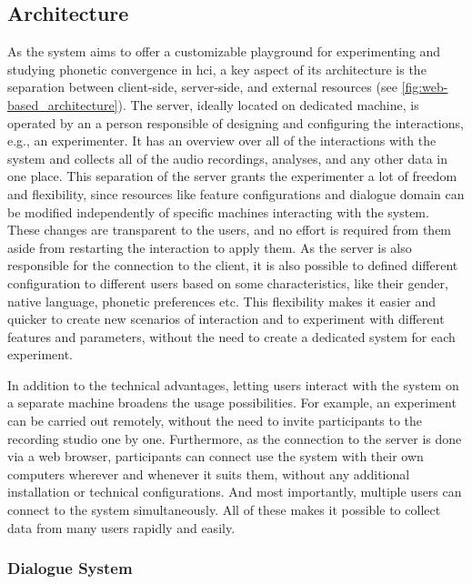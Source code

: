\subsection{Architecture}
\label{subsec:architecture}

As the system aims to offer a customizable playground for experimenting and studying phonetic convergence in \ac{hci}, a key aspect of its architecture is the separation between client-side, server-side, and external resources (see \cref{fig:web-based_architecture}).
The server, ideally located on dedicated machine, is operated by an a person responsible of designing and configuring the interactions, e.g., an experimenter.
It has an overview over all of the interactions with the system and collects all of the audio recordings, analyses, and any other data in one place.
This separation of the server grants the experimenter a lot of freedom and flexibility, since resources like feature configurations and dialogue domain can be modified independently of specific machines interacting with the system.
These changes are transparent to the users, and no effort is required from them aside from restarting the interaction to apply them.
As the server is also responsible for the connection to the client, it is also possible to defined different configuration to different users based on some characteristics, like their gender, native language, phonetic preferences etc.
This flexibility makes it easier and quicker to create new scenarios of interaction and to experiment with different features and parameters, without the need to create a dedicated system for each experiment.

In addition to the technical advantages, letting users interact with the system on a separate machine broadens the usage possibilities.
For example, an experiment can be carried out remotely, without the need to invite participants to the recording studio one by one.
Furthermore, as the connection to the server is done via a web browser, participants can connect use the system with their own computers wherever and whenever it suits them, without any additional installation or technical configurations.
And most importantly, multiple users can connect to the system simultaneously.
All of these makes it possible to collect data from many users rapidly and easily.

\subsubsection{Dialogue System}
\label{subsubsec:dialogue_system}

